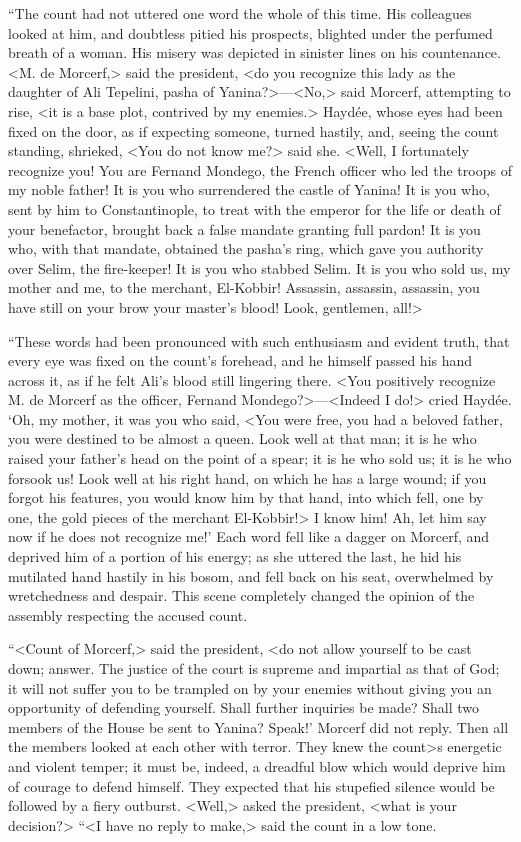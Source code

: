  “The count had not uttered one word the whole of this time. His colleagues looked at him, and doubtless pitied his prospects, blighted under the perfumed breath of a woman. His misery was depicted in sinister lines on his countenance. <M. de Morcerf,> said the president, <do you recognize this lady as the daughter of Ali Tepelini, pasha of Yanina?>—<No,> said Morcerf, attempting to rise, <it is a base plot, contrived by my enemies.> Haydée, whose eyes had been fixed on the door, as if expecting someone, turned hastily, and, seeing the count standing, shrieked, <You do not know me?> said she. <Well, I fortunately recognize you! You are Fernand Mondego, the French officer who led the troops of my noble father! It is you who surrendered the castle of Yanina! It is you who, sent by him to Constantinople, to treat with the emperor for the life or death of your benefactor, brought back a false mandate granting full pardon! It is you who, with that mandate, obtained the pasha's ring, which gave you authority over Selim, the fire-keeper! It is you who stabbed Selim. It is you who sold us, my mother and me, to the merchant, El-Kobbir! Assassin, assassin, assassin, you have still on your brow your master's blood! Look, gentlemen, all!> 

 “These words had been pronounced with such enthusiasm and evident truth, that every eye was fixed on the count's forehead, and he himself passed his hand across it, as if he felt Ali's blood still lingering there. <You positively recognize M. de Morcerf as the officer, Fernand Mondego?>—<Indeed I do!> cried Haydée. ‘Oh, my mother, it was you who said, <You were free, you had a beloved father, you were destined to be almost a queen. Look well at that man; it is he who raised your father's head on the point of a spear; it is he who sold us; it is he who forsook us! Look well at his right hand, on which he has a large wound; if you forgot his features, you would know him by that hand, into which fell, one by one, the gold pieces of the merchant El-Kobbir!> I know him! Ah, let him say now if he does not recognize me!' Each word fell like a dagger on Morcerf, and deprived him of a portion of his energy; as she uttered the last, he hid his mutilated hand hastily in his bosom, and fell back on his seat, overwhelmed by wretchedness and despair. This scene completely changed the opinion of the assembly respecting the accused count. 

 “<Count of Morcerf,> said the president, <do not allow yourself to be cast down; answer. The justice of the court is supreme and impartial as that of God; it will not suffer you to be trampled on by your enemies without giving you an opportunity of defending yourself. Shall further inquiries be made? Shall two members of the House be sent to Yanina? Speak!' Morcerf did not reply. Then all the members looked at each other with terror. They knew the count>s energetic and violent temper; it must be, indeed, a dreadful blow which would deprive him of courage to defend himself. They expected that his stupefied silence would be followed by a fiery outburst. <Well,> asked the president, <what is your decision?>  “<I have no reply to make,> said the count in a low tone. 

